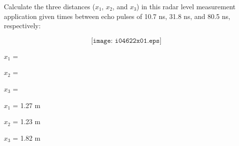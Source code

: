 

Calculate the three distances ($x_1$, $x_2$, and $x_3$) in this radar level measurement application given times between echo pulses of 10.7 ns, 31.8 ns, and 80.5 ns, respectively:

$$\texttt{[image: i04622x01.eps]}$$

$x_1$ = \underbar{\hskip 50pt}

\vskip 10pt

$x_2$ = \underbar{\hskip 50pt}

\vskip 10pt

$x_3$ = \underbar{\hskip 50pt}

\vskip 10pt







$x_1$ = 1.27 m

\vskip 10pt

$x_2$ = 1.23 m

\vskip 10pt

$x_3$ = 1.82 m











